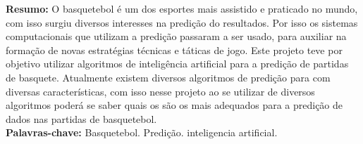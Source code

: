 \begin{singlespace}
\textbf{Resumo:}
O basquetebol é um dos esportes mais assistido e praticado no mundo, com isso surgiu diversos interesses na predição do resultados. Por isso os sistemas computacionais que utilizam a predição passaram a ser usado, para auxiliar na formação de novas estratégias técnicas e táticas de jogo. Este projeto teve por objetivo utilizar algoritmos de inteligência artificial para a predição de partidas de basquete. Atualmente existem diversos algoritmos de predição para com diversas características, com isso nesse projeto ao se utilizar de diversos algoritmos poderá se saber quais os são os mais adequados para a predição de dados nas partidas de basquetebol.\\
\textbf{Palavras-chave: }
Basquetebol. Predição. inteligencia artificial.
\end{singlespace}
